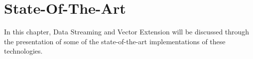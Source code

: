 
\chapter{State-Of-The-Art}
\label{chapter:state_art}
In this chapter, Data Streaming and Vector Extension will be discussed through the presentation of some of the state-of-the-art implementations of these technologies.








